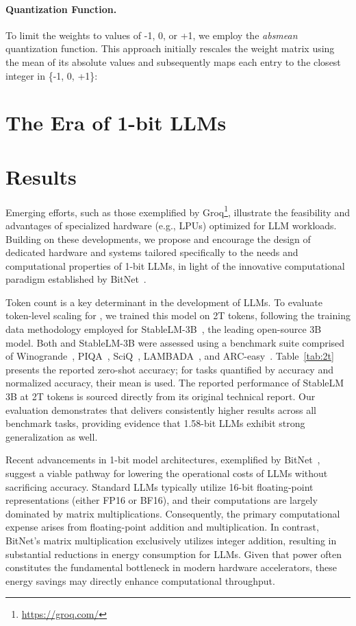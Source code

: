 \paragraph{Quantization Function.} To limit the weights to values of -1, 0, or +1, we employ the \emph{absmean} quantization function. This approach initially rescales the weight matrix using the mean of its absolute values and subsequently maps each entry to the closest integer in \{-1, 0, +1\}:

\section{The Era of 1-bit LLMs}

\section{Results}

Emerging efforts, such as those exemplified by Groq\footnote{\url{https://groq.com/}}, illustrate the feasibility and advantages of specialized hardware (e.g., LPUs) optimized for LLM workloads. Building on these developments, we propose and encourage the design of dedicated hardware and systems tailored specifically to the needs and computational properties of 1-bit LLMs, in light of the innovative computational paradigm established by BitNet~\cite{bitnet}.

Token count is a key determinant in the development of LLMs. To evaluate token-level scaling for , we trained this model on 2T tokens, following the training data methodology employed for StableLM-3B~\cite{StableLM-3B-4E1T}, the leading open-source 3B model. Both  and StableLM-3B were assessed using a benchmark suite comprised of Winogrande~\cite{winoGrande}, PIQA~\cite{piqa}, SciQ~\cite{sciq}, LAMBADA~\cite{lambada}, and ARC-easy~\cite{arc}. Table~\ref{tab:2t} presents the reported zero-shot accuracy; for tasks quantified by accuracy and normalized accuracy, their mean is used. The reported performance of StableLM 3B at 2T tokens is sourced directly from its original technical report. Our evaluation demonstrates that  delivers consistently higher results across all benchmark tasks, providing evidence that 1.58-bit LLMs exhibit strong generalization as well.

Recent advancements in 1-bit model architectures, exemplified by BitNet~\cite{bitnet}, suggest a viable pathway for lowering the operational costs of LLMs without sacrificing accuracy. Standard LLMs typically utilize 16-bit floating-point representations (either FP16 or BF16), and their computations are largely dominated by matrix multiplications. Consequently, the primary computational expense arises from floating-point addition and multiplication. In contrast, BitNet's matrix multiplication exclusively utilizes integer addition, resulting in substantial reductions in energy consumption for LLMs. Given that power often constitutes the fundamental bottleneck in modern hardware accelerators, these energy savings may directly enhance computational throughput.

